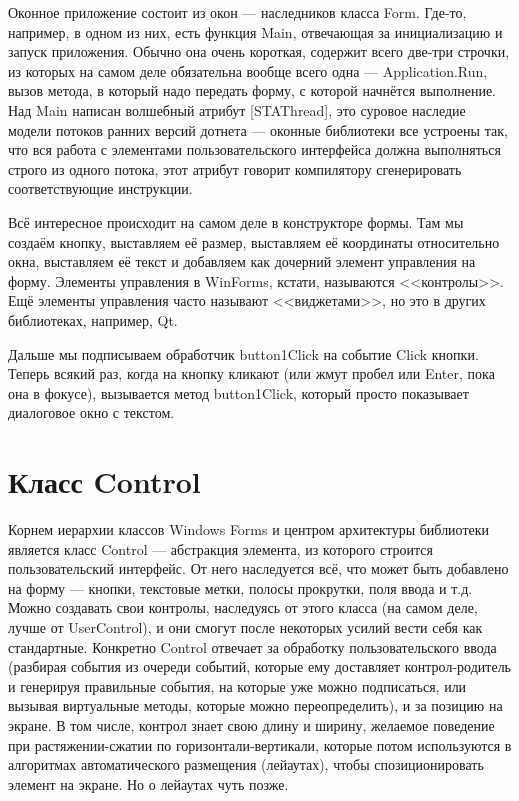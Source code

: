 \documentclass[a5paper]{article}
\begin{document}
Оконное приложение состоит из окон --- наследников класса Form. Где-то, например, в одном из них, есть функция Main, отвечающая за инициализацию и запуск приложения. Обычно она очень короткая, содержит всего две-три строчки, из которых на самом деле обязательна вообще всего одна --- Application.Run, вызов метода, в который надо передать форму, с которой начнётся выполнение. Над Main написан волшебный атрибут [STAThread], это суровое наследие модели потоков ранних версий дотнета --- оконные библиотеки все устроены так, что вся работа с элементами пользовательского интерфейса должна выполняться строго из одного потока, этот атрибут говорит компилятору сгенерировать соответствующие инструкции.

Всё интересное происходит на самом деле в конструкторе формы. Там мы создаём кнопку, выставляем её размер, выставляем её координаты относительно окна, выставляем её текст и добавляем как дочерний элемент управления на форму. Элементы управления в WinForms, кстати, называются <<контролы>>. Ещё элементы управления часто называют <<виджетами>>, но это в других библиотеках, например, Qt. 

Дальше мы подписываем обработчик button1Click на событие Click кнопки. Теперь всякий раз, когда на кнопку кликают (или жмут пробел или Enter, пока она в фокусе), вызывается метод button1Click, который просто показывает диалоговое окно с текстом.

\section{Класс Control}

Корнем  иерархии классов Windows Forms и центром архитектуры библиотеки является класс Control --- абстракция элемента, из которого строится пользовательский интерфейс. От него наследуется всё, что может быть добавлено на форму --- кнопки, текстовые метки, полосы прокрутки, поля ввода и т.д. Можно создавать свои контролы, наследуясь от этого класса (на самом деле, лучше от UserControl), и они смогут после некоторых усилий вести себя как стандартные. Конкретно Control отвечает за обработку пользовательского ввода (разбирая события из очереди событий, которые ему доставляет контрол-родитель и генерируя правильные события, на которые уже можно подписаться, или вызывая виртуальные методы, которые можно переопределить), и за позицию на экране. В том числе, контрол знает свою длину и ширину, желаемое поведение при растяжении-сжатии по горизонтали-вертикали, которые потом используются в алгоритмах автоматического размещения (лейаутах), чтобы спозиционировать элемент на экране. Но о лейаутах чуть позже.
\end{document}
